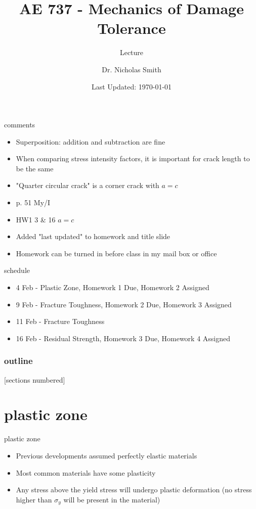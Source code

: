 \documentclass[10pt,handout]{beamer}
\title{AE 737 - Mechanics of Damage Tolerance}
\subtitle{Lecture \arabic{lecture}}
\date{Last Updated: \today}
\author{Dr. Nicholas Smith}
\institute{Wichita State University, Department of Aerospace Engineering}
\begin{document}
\maketitle
\begin{frame}{comments}
	\begin{itemize}
		\item Superposition: addition and subtraction are fine
		\item When comparing stress intensity factors, it is important for crack length to be the same
		\item "Quarter circular crack" is a corner crack with $a=c$
		\item p. 51 My/I
		\item HW1 3 \& 16 $a=c$
		\item Added "last updated" to homework and title slide
		\item Homework can be turned in before class in my mail box or office
	\end{itemize}
\end{frame}

\begin{frame}{schedule}
	\begin{itemize}
		\item 4 Feb - Plastic Zone, Homework 1 Due, Homework 2 Assigned
		\item 9 Feb - Fracture Toughness, Homework 2 Due, Homework 3 Assigned
		\item 11 Feb - Fracture Toughness
		\item 16 Feb - Residual Strength, Homework 3 Due, Homework 4 Assigned
	\end{itemize}
\end{frame}

\begin{frame}
  \frametitle{outline}
  [sections numbered]
  \tableofcontents[hideallsubsections]
\end{frame}

\section{plastic zone}

\begin{frame}{plastic zone}
	\begin{itemize}
		\item Previous developments assumed perfectly elastic materials
		\item Most common materials have some plasticity
		\item Any stress above the yield stress will undergo plastic deformation (no stress higher than $\sigma_y$ will be present in the material)
	\end{itemize}
\end{frame}
\end{document}
